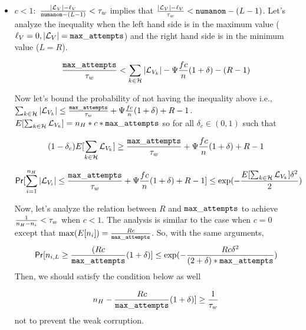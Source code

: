 \begin{itemize}
	\item $ c < 1: $  $ \frac{|\mathcal{L}_V|- \ell_V}{\mathtt{numanom}-(L-1)} <  \tau_w$  implies that $ \frac{|\mathcal{L}_V|- \ell_V}{\tau_w} < \mathtt{numanom}-(L-1)  $. Let's analyze the inequality when the left hand side is in the maximum value ($ \ell_V = 0, |\mathcal{L}_V| = \mathtt{max\_attempts}$) and the right hand side is in the minimum value ($ L = R $).
	
	$$ \frac{\mathtt{max\_attempts}}{\tau_w} <  \sum_{k \in \mathcal{H}} |\mathcal{L}_{V_k}| -  \Psi \frac{fc}{n} (1+ \delta)-(R-1)  $$
	
	
	Now let's bound the probability of not having the inequality above i.e.,	$  \sum_{k \in \mathcal{H}} |\mathcal{L}_{V_k}|   \leq \frac{\mathtt{max\_attempts}}{\tau_w} + \Psi \frac{fc}{n} (1+ \delta) +R-1$. 
	$E[\sum_{k\in\mathcal{H}}\mathcal{L}_{V_k}] = n_H*c * \mathtt{max\_attempts} $ so  for all $ \delta_c \in (0,1) $ such that 
	
	\begin{equation}\label{cond:lc1}
	(1-\delta_c) E[\sum_{k \in \mathcal{H}}\mathcal{L}_{V_k}] \geq \frac{\mathtt{max\_attempts}}{\tau_w} + \Psi \frac{fc}{n} (1+ \delta) +R-1 
	\end{equation}
	
	
	\begin{equation}\label{eq:duringepoch}
	\mathsf{Pr}[\sum_{i = 1}^{n_H}|\mathcal{L}_{V_i}| \leq \frac{\mathtt{max\_attempts}}{\tau_w} + \Psi \frac{fc}{n} (1+ \delta) +R-1] \leq \exp(-\frac{E[\sum_{k \in \mathcal{H}}\mathcal{L}_{V_k}]\delta^2}{2} ) \nonumber
	\end{equation}
	
	Now, let's analyze the relation between $ R $ and $ \mathtt{max\_attempts} $ to achieve $ \frac{1}{n_H - n_i} < \tau_w$ when $ c < 1 $. The analysis is similar to the case when $ c=0 $ except that $ \max(E[n_{i}]) = \frac{Rc}{\mathtt{max\_attempts}} $. So, with the same arguments,
	\begin{equation}
	\mathsf{Pr}[n_{i,L} \geq    \frac{(Rc}{\mathtt{max\_attempts}} (1+\delta)] \leq \exp(-\frac{Rc\delta^2}{(2+\delta)*\mathtt{max\_attempts}})  \nonumber
	\end{equation} 
	Then, we should satisfy the condition below as well
	
	\begin{equation}\label{cond:nl1}
	n_H -\frac{Rc}{\mathtt{max\_attempts}} (1+\delta)]  \geq \frac{1}{\tau_w} 
	\end{equation}
	not to prevent the weak corruption.
	
\end{itemize}


